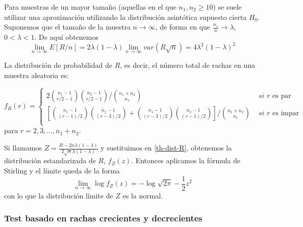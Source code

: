 	Para muestras de un mayor tamaño (aquellas en el que $n_1, n_2 \geq 10$) se suele utilizar una aproximación utilizando la distribución asintótica supuesto cierta $H_0$.\\
	Suponemos que el tamaño de la muestra $n \rightarrow \infty$, de forma en que $\frac{n_1}{n} \rightarrow \lambda$, $0<\lambda<1$. De aquí obtenemos
	\[ \underset{n \rightarrow \infty}{\lim} E[R/n] = 
			2\lambda (1-\lambda) 
				\underset{n \rightarrow \infty}{\lim} 
					var(R\sqrt{n}) =
			4\lambda^2(1-\lambda)^2
	\]
	
\begin{teorema}
	La distribución de probabilidad de $R$, es decir, el número total de rachas en una muestra aleatoria es:
	
	\begin{equation}
		f_R(r) = \left\lbrace\begin{array}{ll}
	2 {n_1-1 \choose r/2-1} {n_2-1 \choose r/2-1} 
		\big/ {n_1 + n_2 \choose n_1} &
			\textit{ si } r \text{ es par} \\
	\left[
		{n_1-1 \choose (r-1)/2} {n_2-1 \choose (r-3)/2} +  
		{n_1-1 \choose (r-3)/2} {n_2-1 \choose (r-1)/2} 
	\right]
		\big/ {n_1 + n_2 \choose n_1} &
			\textit{ si } r \text{ es impar} \\		
		\end{array}\right.
	\label{th-dist-R}
	\end{equation}
	para $r=2, 3, \dots, n_1 + n_2.$
\end{teorema}
	
	Si llamamos $Z = \frac{R - 2n\lambda (1-\lambda)}{2 \sqrt{n}\lambda (1-\lambda)}$ y sustituimos en \ref{th-dist-R}, obtenemos la distribución estandarizada de $R$, $f_Z(z)$. Entonces aplicamos la fórmula de Stirling y el límite queda de la forma
	\[ \underset{n \rightarrow \infty}{\lim} \log f_Z(z)=
			-\log \sqrt{2\pi} - \frac{1}{2} z^2	\]
	con lo que la distribución límite de $Z$ es la normal. 
	
	
\subsubsection{Test basado en rachas crecientes y decrecientes}	

